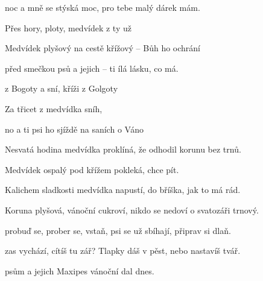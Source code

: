 

\zs
{} noc a mně se stýská moc,
pro tebe malý dárek mám.

Přes hory,  ploty,
medvídek z ty už 

Medvídek plyšový na cestě
křížový -- Bůh ho ochrání

před smečkou  psů
a jejich  --
ti ílá lásku, co  má.
\ks


\zr
{} z Bogoty  a sní,
 kříži z Golgoty 

Za třicet 
z medvídka  sníh,

no a ti  psi
ho sjíždě na saních o Váno
\kr

\zs
Nesvatá hodina medvídka proklíná,
že odhodil korunu bez trnů.

Medvídek ospalý pod křížem pokleká,
chce pít.

Kalichem sladkosti medvídka
napustí, do bříška, jak to má rád.

Koruna plyšová, vánoční cukroví,
nikdo se nedoví o svatozáři trnový.
\ks

\zr \kr

\zs
{} probuď se, prober se, vstaň,
psi se už sbíhají, připrav si dlaň.

 zas vychází, cítíš tu zář?
Tlapky dáš v pěst, nebo nastavíš tvář.

 psům a jejich 
Maxipes  vánoční  dal dnes.
\ks

\zr \kr

\kp






